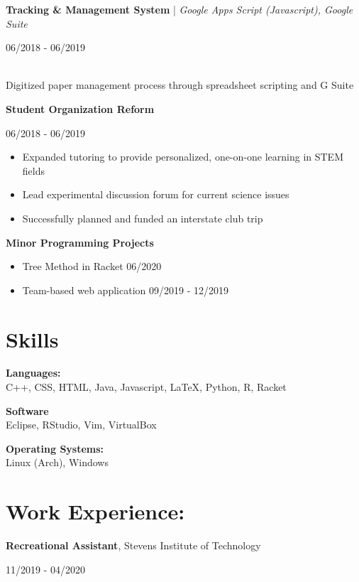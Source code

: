 \documentclass[11pt,letterpaper]{article}
\begin{document}
    \textbf{Tracking \& Management System} | \textit{Google Apps Script (Javascript), Google Suite}\hfill
      \begin{minipage}[t]{1.2in}
        06/2018 - 06/2019
      \end{minipage} \\
      Digitized paper management process through spreadsheet scripting and G Suite
    
    \textbf{Student Organization Reform}\hfill
      \begin{minipage}[t]{1.2in}
        06/2018 - 06/2019
      \end{minipage} 
      
      \begin{itemize}
        \item Expanded tutoring to provide personalized, one-on-one learning in STEM fields
        \item Lead experimental discussion forum for current science issues
        \item Successfully planned and funded an interstate club trip
      \end{itemize}
    
    \textbf{Minor Programming Projects}\hfill
    \begin{itemize}
      \item Tree Method in Racket \hfill 06/2020
      \item Team-based web application \hfill 09/2019 - 12/2019
    \end{itemize}
    

  \section{Skills}
    \textbf{Languages:}\\
    C++, CSS, HTML, Java, Javascript, LaTeX, Python, R, Racket
    
    \begin{minipage}[t]{2.5in}
      \textbf{Software}\\
      Eclipse, RStudio, Vim, VirtualBox
    \end{minipage}\hfill
    \begin{minipage}[t]{1.6in}
      \textbf{Operating Systems:}\\
      Linux (Arch), Windows
    \end{minipage}
    
  \section{Work Experience:}
    \textbf{Recreational Assistant}, Stevens Institute of Technology\hfill
    \begin{minipage}[t]{1.2in}
      11/2019 - 04/2020
    \end{minipage}
    
\end{document}
